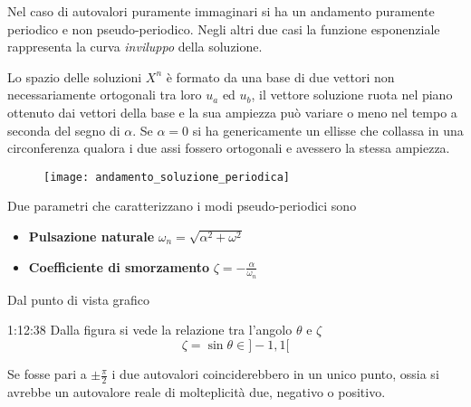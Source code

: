 Nel caso di autovalori puramente immaginari si ha un andamento puramente
periodico e non pseudo-periodico.
Negli altri due casi la funzione esponenziale rappresenta la curva
\textit{inviluppo} della soluzione.

Lo spazio delle soluzioni $X^n$ è formato da una base di due vettori non
necessariamente ortogonali tra loro $u_a$ ed $u_b$, il vettore soluzione ruota
nel piano ottenuto dai vettori della base e la sua ampiezza può variare o meno
nel tempo a seconda del segno di $\alpha$.
Se $\alpha=0$ si ha genericamente un ellisse che collassa in una circonferenza
qualora i due assi fossero ortogonali e avessero la stessa ampiezza.

\begin{figure}[h]
\centering
\texttt{[image: andamento\_soluzione\_periodica]}
\end{figure}

Due parametri che caratterizzano i modi pseudo-periodici sono
\begin{itemize}
\item \textbf{Pulsazione naturale} $\omega_n =
\sqrt{\alpha^2+\omega^2}$
\item \textbf{Coefficiente di smorzamento} $\zeta =
-\frac{\alpha}{\omega_n}$
\end{itemize}

\newpage
Dal punto di vista grafico
\begin{figure}[H]
\centering
{}
\end{figure}
1:12:38
Dalla figura si vede la relazione tra l'angolo $\theta$ e $\zeta$
$$\zeta = \sin\theta \in ]-1,1[$$

Se fosse pari a $\pm\frac{\pi}{2}$ i due autovalori
coinciderebbero in un unico punto, ossia si avrebbe un autovalore reale di
molteplicità due, negativo o positivo.
